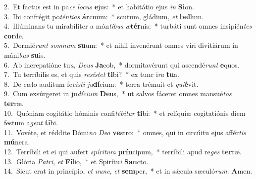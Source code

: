 {2.~}Et factus est in pa\textit{ce} \textit{lo}\textit{cus} \textbf{e}jus:~* et habitátio ejus \textit{in} \textbf{Si}on.\\
{3.~}Ibi confrégit po\textit{tén}\textit{ti}\textit{as} \textbf{ár}cuum:~* scutum, gládium, \textit{et} \textbf{bel}lum.\\
{4.~}Illúminans tu mirabíliter a món\textit{ti}\textit{bus} \textit{æ}\textbf{tér}nis:~* turbáti sunt omnes insipién\textit{tes} \textbf{cor}de.\\
{5.~}Dormié\textit{runt} \textit{som}\textit{num} \textbf{su}um:~* et nihil invenérunt omnes viri divitiárum in máni\textit{bus} \textbf{su}is.\\
{6.~}Ab increpatióne tu\textit{a}, \textit{De}\textit{us} \textbf{Ja}cob,~* dormitavérunt qui ascendé\textit{runt} \textbf{e}quos.\\
{7.~}Tu terríbilis es, et quis \textit{re}\textit{sí}\textit{stet} \textbf{ti}bi?~* ex tunc i\textit{ra} \textbf{tu}a.\\
{8.~}De cælo audítum fe\textit{cí}\textit{sti} \textit{ju}\textbf{dí}cium:~* terra trémuit et \textit{qui}\textbf{é}vit.\\
{9.~}Cum exsúrgeret in ju\textit{dí}\textit{ci}\textit{um} \textbf{De}us,~* ut salvos fáceret omnes mansué\textit{tos} \textbf{ter}ræ.\\
{10.~}Quóniam cogitátio hóminis confi\textit{té}\textit{bi}\textit{tur} \textbf{ti}bi:~* et relíquiæ cogitatiónis diem festum a\textit{gent} \textbf{ti}bi.\\
{11.~}Vovéte, et réddite Dómi\textit{no} \textit{De}\textit{o} \textbf{ve}stro:~* omnes, qui in circúitu ejus affér\textit{tis} \textbf{mú}nera.\\
{12.~}Terríbili et ei qui aufert \textit{spí}\textit{ri}\textit{tum} \textbf{prín}cipum,~* terríbili apud re\textit{ges} \textbf{ter}ræ.\\
{13.~}Glória \textit{Pa}\textit{tri}, \textit{et} \textbf{Fí}lio,~* et Spirítu\textit{i} \textbf{San}cto.\\
{14.~}Sicut erat in princípio, \textit{et} \textit{nunc}, \textit{et} \textbf{sem}per,~* et in sǽcula sæculó\textit{rum}. \textbf{A}men.\\
